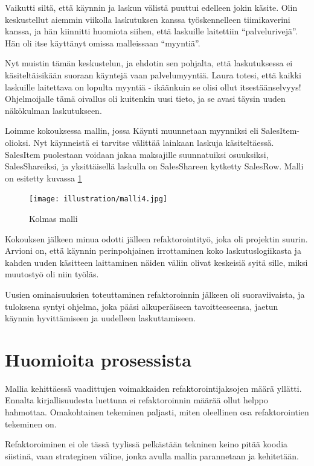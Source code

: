 Vaikutti siltä, että käynnin ja laskun välistä puuttui edelleen jokin
käsite. Olin keskustellut aiemmin viikolla laskutuksen kanssa
työskennelleen tiimikaverini kanssa, ja hän kiinnitti huomiota siihen,
että laskuille laitettiin ``palvelurivejä''. Hän oli itse käyttänyt
omissa malleissaan ``myyntiä''.

Nyt muistin tämän keskustelun, ja ehdotin sen pohjalta, että
laskutuksessa ei käsiteltäisikään suoraan käyntejä vaan palvelumyyntiä.
Laura totesi, että kaikki laskuille laitettava on lopulta myyntiä -
ikäänkuin se olisi ollut itsestäänselvyys! Ohjelmoijalle tämä oivallus
oli kuitenkin uusi tieto, ja se avasi täysin uuden näkökulman
laskutukseen.

Loimme kokouksessa mallin, jossa Käynti muunnetaan myynniksi eli
SalesItem-olioksi. Nyt käynneistä ei tarvitse välittää lainkaan laskuja
käsiteltäessä. SalesItem puolestaan voidaan jakaa maksajille
suunnatuiksi osuuksiksi, SalesShareiksi, ja yksittäisellä laskulla on
SalesShareen kytketty SalesRow. Malli on esitetty kuvassa \ref{malli3}

\begin{figure}
\centering
\texttt{[image: illustration/malli4.jpg]}
\caption{\label{malli3}Kolmas malli}
\end{figure}

Kokouksen jälkeen minua odotti jälleen refaktorointityö, joka oli
projektin suurin. Arvioni on, että käynnin perinpohjainen irrottaminen
koko laskutuslogiikasta ja kahden uuden käsitteen laittaminen näiden
väliin olivat keskeisiä syitä sille, miksi muutostyö oli niin työläs.

Uusien ominaisuuksien toteuttaminen refaktoroinnin jälkeen oli
suoraviivaista, ja tuloksena syntyi ohjelma, joka pääsi alkuperäiseen
tavoitteeseensa, jaetun käynnin hyvittämiseen ja uudelleen
laskuttamiseen.

\hypertarget{huomioita-prosessista}{%
\section{Huomioita prosessista}\label{huomioita-prosessista}}

Mallia kehittäessä vaadittujen voimakkaiden refaktorointijaksojen määrä
yllätti. Ennalta kirjallisuudesta luettuna ei refaktoroinnin määrää
ollut helppo hahmottaa. Omakohtainen tekeminen paljasti, miten
oleellinen osa 
refaktorointien tekeminen on.

Refaktoroiminen ei ole tässä tyylissä pelkästään tekninen keino pitää
koodia siistinä, vaan strateginen väline, jonka avulla mallia
parannetaan ja  kehitetään.

